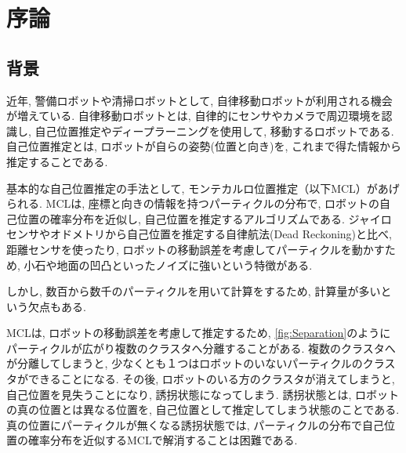 \chapter{序論}
\section{背景}
近年, 警備ロボットや清掃ロボットとして, 自律移動ロボットが利用される機会が増えている. 
自律移動ロボットとは, 自律的にセンサやカメラで周辺環境を認識し, 自己位置推定やディープラーニングを使用して, 移動するロボットである.
自己位置推定とは, ロボットが自らの姿勢(位置と向き)を, これまで得た情報から推定することである.\cite{上田2019}

基本的な自己位置推定の手法として, モンテカルロ位置推定（以下MCL）があげられる. 
MCLは, 座標と向きの情報を持つパーティクルの分布で, ロボットの自己位置の確率分布を近似し, 自己位置を推定するアルゴリズムである.
ジャイロセンサやオドメトリから自己位置を推定する自律航法(Dead Reckoning)と比べ, 距離センサを使ったり, ロボットの移動誤差を考慮してパーティクルを動かすため, 小石や地面の凹凸といったノイズに強いという特徴がある.

しかし, 数百から数千のパーティクルを用いて計算をするため, 計算量が多いという欠点もある.

MCLは, ロボットの移動誤差を考慮して推定するため, \ref{fig:Separation}のようにパーティクルが広がり複数のクラスタへ分離することがある.
複数のクラスタへが分離してしまうと, 少なくとも１つはロボットのいないパーティクルのクラスタができることになる.
その後, ロボットのいる方のクラスタが消えてしまうと, 自己位置を見失うことになり, 誘拐状態になってしまう.
誘拐状態とは, ロボットの真の位置とは異なる位置を, 自己位置として推定してしまう状態のことである.\cite{上田2005}
真の位置にパーティクルが無くなる誘拐状態では, パーティクルの分布で自己位置の確率分布を近似するMCLで解消することは困難である.

